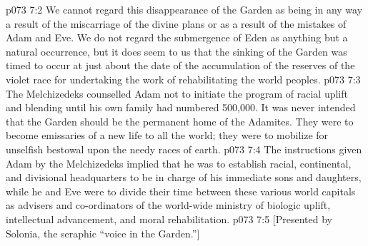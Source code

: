 \vs p073 7:2 We cannot regard this disappearance of the Garden as being in any way a result of the miscarriage of the divine plans or as a result of the mistakes of Adam and Eve. We do not regard the submergence of Eden as anything but a natural occurrence, but it does seem to us that the sinking of the Garden was timed to occur at just about the date of the accumulation of the reserves of the violet race for undertaking the work of rehabilitating the world peoples.
\vs p073 7:3 \pc The Melchizedeks counselled Adam not to initiate the program of racial uplift and blending until his own family had numbered 500,000. It was never intended that the Garden should be the permanent home of the Adamites. They were to become emissaries of a new life to all the world; they were to mobilize for unselfish bestowal upon the needy races of earth.
\vs p073 7:4 The instructions given Adam by the Melchizedeks implied that he was to establish racial, continental, and divisional headquarters to be in charge of his immediate sons and daughters, while he and Eve were to divide their time between these various world capitals as advisers and co\hyp{}ordinators of the world\hyp{}wide ministry of biologic uplift, intellectual advancement, and moral rehabilitation.
\vsetoff
\vs p073 7:5 [Presented by Solonia, the seraphic “voice in the Garden.”]
\quizlink

